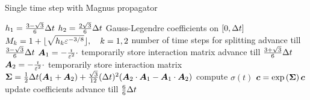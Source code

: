 \begin{algorithm}[ht]
	\caption{Single time step with Magnus propagator}
	\label{alg:magnus}
	\begin{algorithmic}
	\State
		\State
		\State $h_1 = \frac{3-\sqrt{3}}{6} \Delta t$ $h_2 = \frac{2\sqrt{3}}{6} \Delta t$
		\Comment Gauss-Legendre coefficients on $[0,\Delta t]$
		\State $M_{k} = 1 + \lfloor \sqrt{h_{k} \varepsilon^{-3/8}} \rfloor, \quad k=1,2$
		\Comment number of time steps for splitting
		\State
		\State {}
		\Comment advance till $\frac{3-\sqrt{3}}{6} \Delta t$
		\State $\bm{A}_1 = - \frac{\imath}{\varepsilon^2} \cdot$ 
		\Comment temporarily store interaction matrix
		\State {}
		\Comment advance till $\frac{3+\sqrt{3}}{6} \Delta t$
		\State $\bm{A}_2 = - \frac{\imath}{\varepsilon^2} \cdot$ 
		\Comment temporarily store interaction matrix
		\State $\bm{\Sigma} = \frac{1}{2} \Delta t (\bm{A}_1 + \bm{A}_2) + \frac{\sqrt{3}}{12} (\Delta t)^2 (\bm{A}_2 \cdot \bm{A}_1 - \bm{A}_1 \cdot \bm{A}_2)$
		\Comment compute $\sigma (t)$
		\State $\bm{c} = \exp \left( \bm{\Sigma} \right) \bm{c}$
		\Comment update coefficients
		\State {}
		\Comment advance till $\frac{6}{6} \Delta t$
		\State
	\EndProcedure
	\end{algorithmic}
\end{algorithm}

